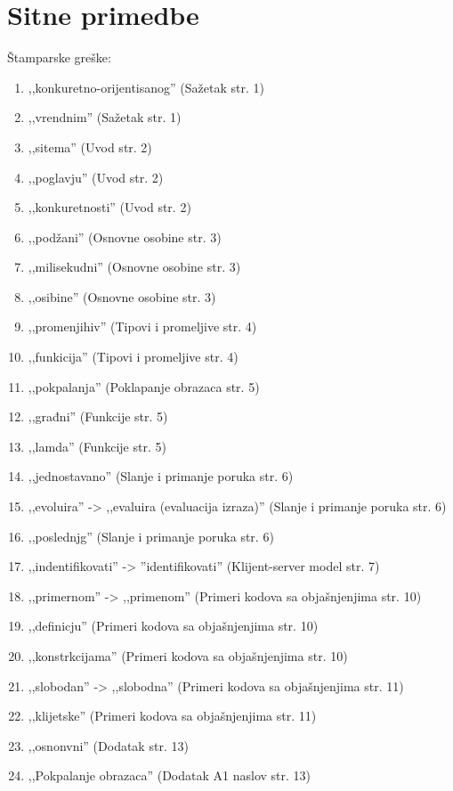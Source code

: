 \documentclass[a4paper]{report}
\begin{document}
\section{Sitne primedbe}
Štamparske greške:
\begin{enumerate}
\item ,,konkuretno-orijentisanog'' (Sažetak str. 1)
\item ,,vrendnim'' (Sažetak str. 1)
\item ,,sitema'' (Uvod str. 2)
\item ,,poglavju'' (Uvod str. 2)
\item ,,konkuretnosti'' (Uvod str. 2)
\item ,,podžani'' (Osnovne osobine str. 3)
\item ,,milisekudni'' (Osnovne osobine str. 3)
\item ,,osibine'' (Osnovne osobine str. 3)
\item ,,promenjihiv'' (Tipovi i promeljive str. 4)
\item ,,funkicija'' (Tipovi i promeljive str. 4)
\item ,,pokpalanja'' (Poklapanje obrazaca str. 5)
\item ,,građni'' (Funkcije str. 5)
\item ,,lamda'' (Funkcije str. 5)
\item ,,jednostavano'' (Slanje i primanje poruka str. 6)
\item ,,evoluira'' -> ,,evaluira (evaluacija izraza)'' (Slanje i primanje poruka str. 6)
\item ,,poslednjg'' (Slanje i primanje poruka str. 6)
\item ,,indentifikovati'' -> ''identifikovati'' (Klijent-server model str. 7)
\item ,,primernom'' -> ,,primenom'' (Primeri kodova sa objašnjenjima str. 10)
\item ,,definicju'' (Primeri kodova sa objašnjenjima str. 10)
\item ,,konstrkcijama'' (Primeri kodova sa objašnjenjima str. 10)
\item ,,slobodan'' -> ,,slobodna'' (Primeri kodova sa objašnjenjima str. 11)
\item ,,klijetske'' (Primeri kodova sa objašnjenjima str. 11)
\item ,,osnonvni'' (Dodatak str. 13)
\item ,,Pokpalanje obrazaca'' (Dodatak A1 naslov str. 13) 
\end{enumerate}
\end{document}

